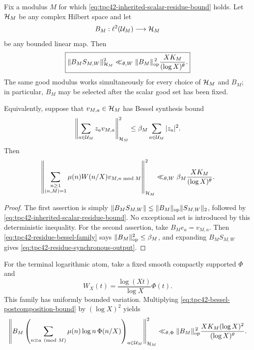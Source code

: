\begin{proposition}
\label{prop:tpc42-simultaneous-bessel-transfer}
Fix a modulus \(M\) for which
\eqref{eq:tpc42-inherited-scalar-residue-bound} holds.  Let \(\mathcal H_M\) be
any complex Hilbert space and let
\begin{equation}
 B_M:\ell^2(\mathcal U_M)\longrightarrow\mathcal H_M
 \label{eq:tpc42-bessel-operator}
\end{equation}
be any bounded linear map.  Then
\begin{equation}
 \boxed{
 \|B_MS_{M,W}\|_{\mathcal H_M}^2
 \ll_{\theta,W}
 \|B_M\|_{\mathrm{op}}^{\,2}
 \frac{XK_M}{(\log X)^\theta}.}
 \label{eq:tpc42-bessel-postcomposition-bound}
\end{equation}
The same good modulus works simultaneously for every choice of
\(\mathcal H_M\) and \(B_M\); in particular, \(B_M\) may be selected after the
scalar good set has been fixed.

Equivalently, suppose that \(v_{M,a}\in\mathcal H_M\) has Bessel synthesis bound
\begin{equation}
 \left\|\sum_{a\in\mathcal U_M}z_av_{M,a}\right\|_{\mathcal H_M}^2
 \le \beta_M\sum_{a\in\mathcal U_M}|z_a|^2.
 \label{eq:tpc42-residue-bessel-family}
\end{equation}
Then
\begin{equation}
 \left\|
  \sum_{\substack{n\ge1\\(n,M)=1}}
  \mu(n)W(n/X)v_{M,n\bmod M}
 \right\|_{\mathcal H_M}^2
 \ll_{\theta,W}
 \beta_M\frac{XK_M}{(\log X)^\theta}.
 \label{eq:tpc42-residue-synchronous-output}
\end{equation}
\end{proposition}

\begin{proof}
The first assertion is simply
\(\|B_MS_{M,W}\|\le\|B_M\|_{\mathrm{op}}\|S_{M,W}\|_2\), followed by
\eqref{eq:tpc42-inherited-scalar-residue-bound}.  No exceptional set is
introduced by this deterministic inequality.  For the second assertion,
take \(B_Me_a=v_{M,a}\).  Then
\eqref{eq:tpc42-residue-bessel-family} says
\(\|B_M\|_{\mathrm{op}}^2\le\beta_M\), and expanding \(B_MS_{M,W}\) gives
\eqref{eq:tpc42-residue-synchronous-output}.
\end{proof}

For the terminal logarithmic atom, take a fixed smooth compactly
supported \(\Phi\) and
\[
 W_X(t)=\frac{\log(Xt)}{\log X}\Phi(t).
\]
This family has uniformly bounded variation.  Multiplying
\eqref{eq:tpc42-bessel-postcomposition-bound} by \((\log X)^2\) yields
\begin{equation}
 \left\|
 B_M\left(
  \sum_{\substack{n\equiv a\pmod M}}
  \mu(n)\log n\,\Phi(n/X)
 \right)_{a\in\mathcal U_M}
 \right\|_{\mathcal H_M}^{2}
 \ll_{\theta,\Phi}
 \|B_M\|_{\mathrm{op}}^{\,2}
 \frac{XK_M(\log X)^2}{(\log X)^\theta}.
 \label{eq:tpc42-terminal-bessel-postcomposition}
\end{equation}

